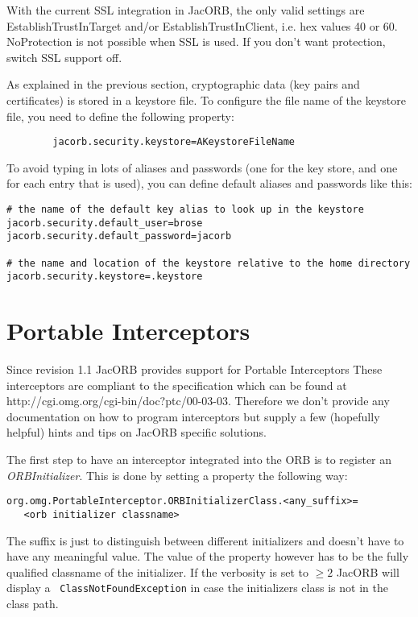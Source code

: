 \documentclass[12pt]{scrbook}
\begin{document}
With the  current SSL integration  in JacORB, the only  valid settings
are  EstablishTrustInTarget  and/or  EstablishTrustInClient, i.e.  hex
values 40 or 60. NoProtection is not possible when SSL is used. If you
don't want protection, switch SSL support off.

As explained  in the previous  section, cryptographic data  (key pairs
and  certificates) is  stored in  a  keystore  file. To configure the
file name of the keystore file, you need to define the following
property:

\begin{verbatim}
        jacorb.security.keystore=AKeystoreFileName
\end{verbatim}

To avoid  typing in  lots of  aliases and passwords  (one for  the key
store, and  one for each entry  that is used), you  can define default
aliases and passwords like this:

\begin{verbatim}
# the name of the default key alias to look up in the keystore
jacorb.security.default_user=brose
jacorb.security.default_password=jacorb

# the name and location of the keystore relative to the home directory
jacorb.security.keystore=.keystore
\end{verbatim}


\chapter{Portable Interceptors}

Since revision  1.1 JacORB provides support  for Portable Interceptors
These  interceptors are compliant  to the  specification which  can be
found  at  http://cgi.omg.org/cgi-bin/doc?ptc/00-03-03.  Therefore  we
don't  provide any  documentation on  how to  program  interceptors but
supply a  few (hopefully  helpful) hints and  tips on  JacORB specific
solutions.

The first  step to have an  interceptor integrated into the  ORB is to
register an {\em  ORBInitializer}. This is done by  setting a property
the following way:
\begin{verbatim}org.omg.PortableInterceptor.ORBInitializerClass.<any_suffix>=
   <orb initializer classname>
\end{verbatim}
The suffix  is just to distinguish between  different initializers and
doesn't have to  have any meaningful value. The  value of the property
however has to be the fully qualified classname of the initializer. If
the  verbosity  is  set  to  $\geq  2$  JacORB  will  display  a  {\tt
ClassNotFoundException} in  case the initializers class is  not in the
class path. 
\end{document}
